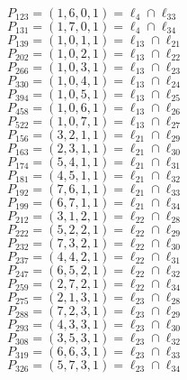 \documentclass{article}
\begin{document}
{\begin{multicols}{2}
$P_{123} = ( 1, 6, 0, 1 ) = \ell_{4} \cap \ell_{33} $\\
$P_{131} = ( 1, 7, 0, 1 ) = \ell_{4} \cap \ell_{34} $\\
$P_{139} = ( 1, 0, 1, 1 ) = \ell_{13} \cap \ell_{21} $\\
$P_{202} = ( 1, 0, 2, 1 ) = \ell_{13} \cap \ell_{22} $\\
$P_{266} = ( 1, 0, 3, 1 ) = \ell_{13} \cap \ell_{23} $\\
$P_{330} = ( 1, 0, 4, 1 ) = \ell_{13} \cap \ell_{24} $\\
$P_{394} = ( 1, 0, 5, 1 ) = \ell_{13} \cap \ell_{25} $\\
$P_{458} = ( 1, 0, 6, 1 ) = \ell_{13} \cap \ell_{26} $\\
$P_{522} = ( 1, 0, 7, 1 ) = \ell_{13} \cap \ell_{27} $\\
$P_{156} = ( 3, 2, 1, 1 ) = \ell_{21} \cap \ell_{29} $\\
$P_{163} = ( 2, 3, 1, 1 ) = \ell_{21} \cap \ell_{30} $\\
$P_{174} = ( 5, 4, 1, 1 ) = \ell_{21} \cap \ell_{31} $\\
$P_{181} = ( 4, 5, 1, 1 ) = \ell_{21} \cap \ell_{32} $\\
$P_{192} = ( 7, 6, 1, 1 ) = \ell_{21} \cap \ell_{33} $\\
$P_{199} = ( 6, 7, 1, 1 ) = \ell_{21} \cap \ell_{34} $\\
$P_{212} = ( 3, 1, 2, 1 ) = \ell_{22} \cap \ell_{28} $\\
$P_{222} = ( 5, 2, 2, 1 ) = \ell_{22} \cap \ell_{29} $\\
$P_{232} = ( 7, 3, 2, 1 ) = \ell_{22} \cap \ell_{30} $\\
$P_{237} = ( 4, 4, 2, 1 ) = \ell_{22} \cap \ell_{31} $\\
$P_{247} = ( 6, 5, 2, 1 ) = \ell_{22} \cap \ell_{32} $\\
$P_{259} = ( 2, 7, 2, 1 ) = \ell_{22} \cap \ell_{34} $\\
$P_{275} = ( 2, 1, 3, 1 ) = \ell_{23} \cap \ell_{28} $\\
$P_{288} = ( 7, 2, 3, 1 ) = \ell_{23} \cap \ell_{29} $\\
$P_{293} = ( 4, 3, 3, 1 ) = \ell_{23} \cap \ell_{30} $\\
$P_{308} = ( 3, 5, 3, 1 ) = \ell_{23} \cap \ell_{32} $\\
$P_{319} = ( 6, 6, 3, 1 ) = \ell_{23} \cap \ell_{33} $\\
$P_{326} = ( 5, 7, 3, 1 ) = \ell_{23} \cap \ell_{34} $\\

\end{multicols}}
\end{document}
